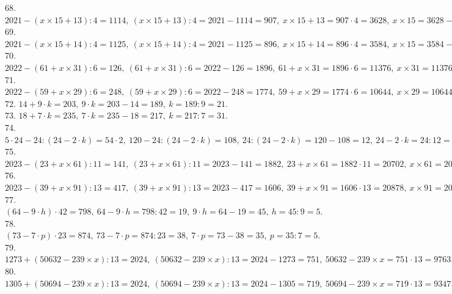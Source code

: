 \documentclass[12pt]{article}
\begin{document}
68. $2021-(x\times15+13):4=1114,\ (x\times15+13):4=2021-1114=907,\ x\times15+13=907\cdot4=3628,\ x\times15=3628-13=3615,\ x=3615:15=241.$\\
69. $2021-(x\times15+14):4=1125,\ (x\times15+14):4=2021-1125=896,\ x\times15+14=896\cdot4=3584,\ x\times15=3584-14=3570,\ x=3570:15=238.$\\
70. $2022-(61+x\times31):6=126,\ (61+x\times31):6=2022-126=1896,\ 61+x\times31=1896\cdot6=11376,\ x\times31=11376-61=11315,\ x=11315:31=365.$\\
71. $2022-(59+x\times29):6=248,\ (59+x\times29):6=2022-248=1774,\ 59+x\times29=1774\cdot6=10644,\ x\times29=10644-59=10585,\ x=10585:29=365.$\\
72. $14+9\cdot k=203,\ 9\cdot k=203-14=189,\ k=189:9=21.$\\
73. $18+7\cdot k=235,\ 7\cdot k=235-18=217,\ k=217:7=31.$\\
74. $5\cdot24-24:(24-2\cdot k)=54\cdot2,\ 120-24:(24-2\cdot k)=108,\ 24:(24-2\cdot k)=120-108=12,\ 24-2\cdot k=24:12=2,\ 2\cdot k=24-2=22,\ k=22:2=11.$\\
75. $2023 - (23 + x \times 61) : 11 = 141,\ (23 + x \times 61) : 11 =2023-141=1882,\ 23 + x \times 61=1882\cdot11=20702,\ x \times 61=20702-23=20679,\ x=20679:61=339.$\\
76. $2023 - (39 + x \times 91) : 13 = 417,\ (39 + x \times 91) : 13 = 2023-417=1606,\ 39 + x \times 91=1606\cdot13=20878,\ x \times 91=20878-39=20839,\ x=20839:91=229.$\\
77. $(64 - 9 \cdot h) \cdot 42 = 798,\ 64 - 9 \cdot h=798:42=19,\ 9 \cdot h=64-19=45,\ h=45:9=5.$\\
78. $(73 - 7 \cdot p) \cdot 23 = 874,\ 73 - 7 \cdot p=874:23=38,\ 7 \cdot p=73-38=35,\ p=35:7=5.$\\
79. $1273+(50632-239\times x):13=2024,\ (50632-239\times x):13=2024-1273=751,\ 50632-239\times x=751\cdot13=9763,\ 239\times x=50632-9763=40869,\ x=40869:239=171.$\\
80. $1305+(50694-239\times x):13=2024,\ (50694-239\times x):13=2024-1305=719,\ 50694-239\times x=719\cdot13=9347,\ 239\times x=50694-9347=41347,\ x=41347:239=173.$
\newpage
\end{document}
